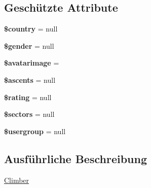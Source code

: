 \subsection*{Geschützte Attribute}
\begin{DoxyCompactItemize}
\item 
\mbox{\label{classCsp_1_1Pinkpoint_1_1Domain_1_1Model_1_1Climber_ad3f022e1720e97b71bb0258aab7f6f2a}} 
{\bfseries \$country} = null
\item 
\mbox{\label{classCsp_1_1Pinkpoint_1_1Domain_1_1Model_1_1Climber_a74090649ca98b2431163122168f5896d}} 
{\bfseries \$gender} = null
\item 
\mbox{\label{classCsp_1_1Pinkpoint_1_1Domain_1_1Model_1_1Climber_afa0b0e3b38d436f1610f325c1b64da1c}} 
{\bfseries \$avatarimage} = \textquotesingle{}\textquotesingle{}
\item 
\mbox{\label{classCsp_1_1Pinkpoint_1_1Domain_1_1Model_1_1Climber_a8162ba830df1343567325710bfa6de37}} 
{\bfseries \$ascents} = null
\item 
\mbox{\label{classCsp_1_1Pinkpoint_1_1Domain_1_1Model_1_1Climber_aa4652f5a8315179e37f5a3ee13ddbd1b}} 
{\bfseries \$rating} = null
\item 
\mbox{\label{classCsp_1_1Pinkpoint_1_1Domain_1_1Model_1_1Climber_a21311123e2ef9ec3fb8b52cecf70dcfe}} 
{\bfseries \$sectors} = null
\item 
\mbox{\label{classCsp_1_1Pinkpoint_1_1Domain_1_1Model_1_1Climber_af723b42e2844747bc6001bf84fed1043}} 
{\bfseries \$usergroup} = null
\end{DoxyCompactItemize}


\subsection{Ausführliche Beschreibung}
\hyperlink{classCsp_1_1Pinkpoint_1_1Domain_1_1Model_1_1Climber}{Climber} 

